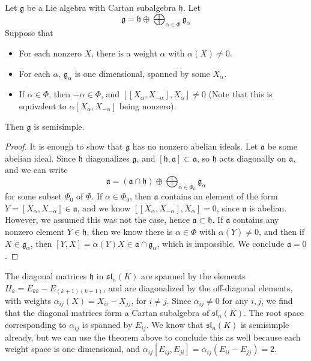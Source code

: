 \begin{theorem}
    Let $\mathfrak{g}$ be a Lie algebra with Cartan subalgebra $\mathfrak{h}$. Let
    \[ \mathfrak{g} = \mathfrak{h} \oplus \bigoplus_{\alpha \in \Phi} \mathfrak{g}_\alpha \]
    Suppose that
    \begin{itemize}
        \item For each nonzero $X$, there is a weight $\alpha$ with $\alpha(X) \neq 0$.
        \item For each $\alpha$, $\mathfrak{g}_\alpha$ is one dimensional, spanned by some $X_\alpha$.
        \item If $\alpha \in \Phi$, then $-\alpha \in \Phi$, and $[[X_\alpha, X_{-\alpha}], X_\alpha] \neq 0$ (Note that this is equivalent to $\alpha[X_\alpha, X_{-\alpha}]$ being nonzero).
    \end{itemize}
    Then $\mathfrak{g}$ is semisimple.
\end{theorem}
\begin{proof}
    It is enough to show that $\mathfrak{g}$ has no nonzero abelian ideals. Let $\mathfrak{a}$ be some abelian ideal. Since $\mathfrak{h}$ diagonalizes $\mathfrak{g}$, and $[\mathfrak{h}, \mathfrak{a}] \subset \mathfrak{a}$, so $\mathfrak{h}$ acts diagonally on $\mathfrak{a}$, and we can write
    \[ \mathfrak{a} = (\mathfrak{a} \cap \mathfrak{h}) \oplus \bigoplus_{\alpha \in \Phi_0} \mathfrak{g}_\alpha \]
    for some subset $\Phi_0$ of $\Phi$. If $\alpha \in \Phi_0$, then $\mathfrak{a}$ contains an element of the form $Y = [X_\alpha, X_{-\alpha}] \in \mathfrak{a}$, and we know $[[X_\alpha, X_{-\alpha}], X_\alpha] = 0$, since $\mathfrak{a}$ is abelian. However, we assumed this was not the case, hence $\mathfrak{a} \subset \mathfrak{h}$. If $\mathfrak{a}$ contains any nonzero element $Y \in \mathfrak{h}$, then we know there is $\alpha \in \Phi$ with $\alpha(Y) \neq 0$, and then if $X \in \mathfrak{g}_\alpha$, then $[Y,X] = \alpha(Y) X \in \mathfrak{a} \cap \mathfrak{g}_\alpha$, which is impossible. We conclude $\mathfrak{a} = 0$.
\end{proof}

\begin{example}
    The diagonal matrices $\mathfrak{h}$ in $\mathfrak{sl}_n(K)$ are spanned by the elements $H_k = E_{kk} - E_{(k+1)(k+1)}$, and are diagonalized by the off-diagonal elements, with weights $\alpha_{ij}(X) = X_{ii} - X_{jj}$, for $i \neq j$. Since $\alpha_{ij} \neq 0$ for any $i,j$, we find that the diagonal matrices form a Cartan subalgebra of $\mathfrak{sl}_n(K)$. The root space corresponding to $\alpha_{ij}$ is spanned by $E_{ij}$. We know that $\mathfrak{sl}_n(K)$ is semisimple already, but we can use the theorem above to conclude this as well because each weight space is one dimensional, and $\alpha_{ij}[E_{ij}, E_{ji}] = \alpha_{ij}(E_{ii} - E_{jj}) = 2$.
\end{example}

